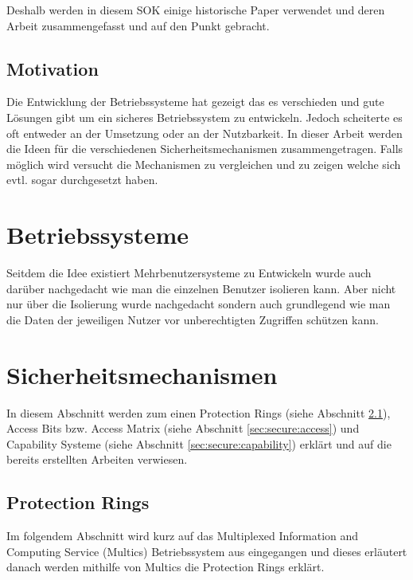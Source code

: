 \documentclass[german, 9pt,technote]{IEEEtran}
\begin{document}
    Deshalb werden in diesem SOK einige historische Paper verwendet und deren Arbeit
    zusammengefasst und auf den Punkt gebracht.
    
    \subsection{Motivation}
      Die Entwicklung der Betriebssysteme hat gezeigt das es verschieden und gute L\"osungen gibt um ein sicheres Betriebssystem zu entwickeln.
      Jedoch scheiterte es oft entweder an der Umsetzung oder an der Nutzbarkeit. 
      In dieser Arbeit werden die Ideen f\"ur die verschiedenen Sicherheitsmechanismen zusammengetragen.
      Falls m\"oglich wird versucht die Mechanismen zu vergleichen und zu zeigen welche sich evtl. sogar durchgesetzt haben.
   \section{Betriebssysteme}
     Seitdem die Idee existiert Mehrbenutzersysteme zu Entwickeln wurde auch dar\"uber nachgedacht wie man die einzelnen Benutzer isolieren kann.
     Aber nicht nur \"uber die Isolierung wurde nachgedacht sondern auch grundlegend wie man die Daten 
     der jeweiligen Nutzer vor unberechtigten Zugriffen sch\"utzen kann.
     
  \section{Sicherheitsmechanismen} \label{sec:secure}
    In diesem Abschnitt werden zum einen Protection Rings (siehe Abschnitt \ref{sec:secure:protectrings}), Access Bits bzw. Access Matrix 
    (siehe Abschnitt \ref{sec:secure:access}) und Capability Systeme (siehe Abschnitt \ref{sec:secure:capability}) erkl\"art und 
    auf die bereits erstellten Arbeiten verwiesen.
    \subsection{Protection Rings} \label{sec:secure:protectrings}
      Im folgendem Abschnitt wird kurz auf das Multiplexed Information and Computing Service (Multics) Betriebssystem
      aus \cite{inproc:multics} eingegangen und dieses erl\"autert danach werden mithilfe von Multics die Protection Rings erkl\"art.
\end{document}
